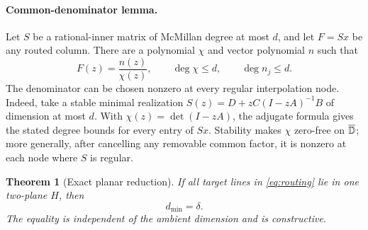\documentclass[11pt]{article}
\newtheorem{theorem}{Theorem}[section]
\theoremstyle{definition}\newtheorem{definition}[theorem]{Definition}\newtheorem{example}[theorem]{Example}
\theoremstyle{remark}\newtheorem{remark}[theorem]{Remark}\newtheorem{limitation}[theorem]{Limitation}
\begin{document}
\paragraph{Common-denominator lemma.}
Let $S$ be a rational-inner matrix of McMillan degree at most $d$, and let
$F=Sx$ be any routed column.  There are a polynomial $\chi$ and vector
polynomial $n$ such that
\[
                         F(z)=\frac{n(z)}{\chi(z)},
 \qquad \deg\chi\le d,\qquad \deg n_j\le d.
\]
The denominator can be chosen nonzero at every regular interpolation node.
Indeed, take a stable minimal realization
$S(z)=D+zC(I-zA)^{-1}B$ of dimension at most $d$.  With
$\chi(z)=\det(I-zA)$, the adjugate formula gives the stated degree bounds for
every entry of $Sx$.  Stability makes $\chi$ zero-free on $\overline{\mathbb D}$; more
generally, after cancelling any removable common factor, it is nonzero at each
node where $S$ is regular.

\begin{theorem}[Exact planar reduction]\label{thm:planar}
If all target lines in \eqref{eq:routing} lie in one two-plane $H$, then
\begin{equation}\label{eq:main}
                            \boxed{d_{\min}=\delta.}
\end{equation}
The equality is independent of the ambient dimension and is constructive.
\end{theorem}
\end{document}

